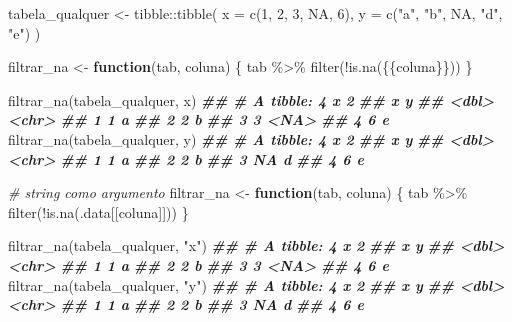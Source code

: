 \documentclass[
]{book}
\newenvironment{Shaded}{\begin{snugshade}}{\end{snugshade}}
\newcommand{\AttributeTok}[1]{\textcolor[rgb]{0.77,0.63,0.00}{#1}}
\newcommand{\CommentTok}[1]{\textcolor[rgb]{0.56,0.35,0.01}{\textit{#1}}}
\newcommand{\ConstantTok}[1]{\textcolor[rgb]{0.00,0.00,0.00}{#1}}
\newcommand{\ControlFlowTok}[1]{\textcolor[rgb]{0.13,0.29,0.53}{\textbf{#1}}}
\newcommand{\DecValTok}[1]{\textcolor[rgb]{0.00,0.00,0.81}{#1}}
\newcommand{\DocumentationTok}[1]{\textcolor[rgb]{0.56,0.35,0.01}{\textbf{\textit{#1}}}}
\newcommand{\FunctionTok}[1]{\textcolor[rgb]{0.00,0.00,0.00}{#1}}
\newcommand{\NormalTok}[1]{#1}
\newcommand{\OtherTok}[1]{\textcolor[rgb]{0.56,0.35,0.01}{#1}}
\newcommand{\SpecialCharTok}[1]{\textcolor[rgb]{0.00,0.00,0.00}{#1}}
\newcommand{\StringTok}[1]{\textcolor[rgb]{0.31,0.60,0.02}{#1}}
\begin{document}
\begin{Shaded}
\begin{Highlighting}[]
\NormalTok{tabela\_qualquer }\OtherTok{\textless{}{-}}\NormalTok{ tibble}\SpecialCharTok{::}\FunctionTok{tibble}\NormalTok{(}
  \AttributeTok{x =} \FunctionTok{c}\NormalTok{(}\DecValTok{1}\NormalTok{, }\DecValTok{2}\NormalTok{, }\DecValTok{3}\NormalTok{, }\ConstantTok{NA}\NormalTok{, }\DecValTok{6}\NormalTok{),}
  \AttributeTok{y =} \FunctionTok{c}\NormalTok{(}\StringTok{"a"}\NormalTok{, }\StringTok{"b"}\NormalTok{, }\ConstantTok{NA}\NormalTok{, }\StringTok{"d"}\NormalTok{, }\StringTok{"e"}\NormalTok{)}
\NormalTok{)}

\NormalTok{filtrar\_na }\OtherTok{\textless{}{-}} \ControlFlowTok{function}\NormalTok{(tab, coluna) \{}
\NormalTok{  tab }\SpecialCharTok{\%\textgreater{}\%}
    \FunctionTok{filter}\NormalTok{(}\SpecialCharTok{!}\FunctionTok{is.na}\NormalTok{(\{\{coluna\}\}))}
\NormalTok{\}}

\FunctionTok{filtrar\_na}\NormalTok{(tabela\_qualquer, x)}
\DocumentationTok{\#\# \# A tibble: 4 x 2}
\DocumentationTok{\#\#       x y    }
\DocumentationTok{\#\#   \textless{}dbl\textgreater{} \textless{}chr\textgreater{}}
\DocumentationTok{\#\# 1     1 a    }
\DocumentationTok{\#\# 2     2 b    }
\DocumentationTok{\#\# 3     3 \textless{}NA\textgreater{} }
\DocumentationTok{\#\# 4     6 e}
\FunctionTok{filtrar\_na}\NormalTok{(tabela\_qualquer, y)}
\DocumentationTok{\#\# \# A tibble: 4 x 2}
\DocumentationTok{\#\#       x y    }
\DocumentationTok{\#\#   \textless{}dbl\textgreater{} \textless{}chr\textgreater{}}
\DocumentationTok{\#\# 1     1 a    }
\DocumentationTok{\#\# 2     2 b    }
\DocumentationTok{\#\# 3    NA d    }
\DocumentationTok{\#\# 4     6 e}


\CommentTok{\# string como argumento}
\NormalTok{filtrar\_na }\OtherTok{\textless{}{-}} \ControlFlowTok{function}\NormalTok{(tab, coluna) \{}
\NormalTok{  tab }\SpecialCharTok{\%\textgreater{}\%}
    \FunctionTok{filter}\NormalTok{(}\SpecialCharTok{!}\FunctionTok{is.na}\NormalTok{(.data[[coluna]]))}
\NormalTok{\}}

\FunctionTok{filtrar\_na}\NormalTok{(tabela\_qualquer, }\StringTok{"x"}\NormalTok{)}
\DocumentationTok{\#\# \# A tibble: 4 x 2}
\DocumentationTok{\#\#       x y    }
\DocumentationTok{\#\#   \textless{}dbl\textgreater{} \textless{}chr\textgreater{}}
\DocumentationTok{\#\# 1     1 a    }
\DocumentationTok{\#\# 2     2 b    }
\DocumentationTok{\#\# 3     3 \textless{}NA\textgreater{} }
\DocumentationTok{\#\# 4     6 e}
\FunctionTok{filtrar\_na}\NormalTok{(tabela\_qualquer, }\StringTok{"y"}\NormalTok{)}
\DocumentationTok{\#\# \# A tibble: 4 x 2}
\DocumentationTok{\#\#       x y    }
\DocumentationTok{\#\#   \textless{}dbl\textgreater{} \textless{}chr\textgreater{}}
\DocumentationTok{\#\# 1     1 a    }
\DocumentationTok{\#\# 2     2 b    }
\DocumentationTok{\#\# 3    NA d    }
\DocumentationTok{\#\# 4     6 e}
\end{Highlighting}
\end{Shaded}
\end{document}
